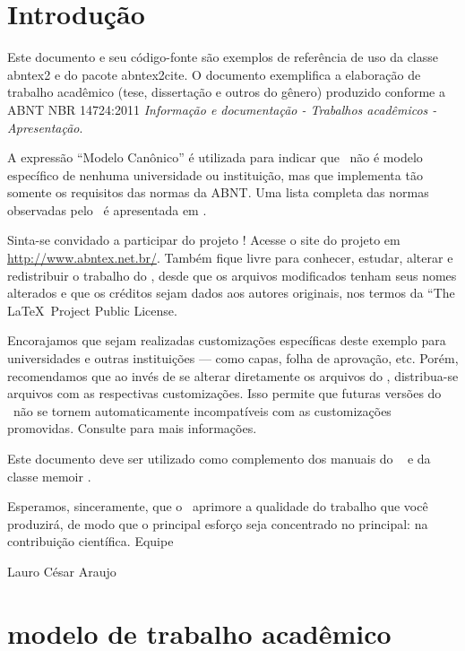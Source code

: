 \textual

\chapter{Introdução}

Este documento e seu código-fonte são exemplos de referência de uso da classe
\textsf{abntex2} e do pacote \textsf{abntex2cite}. O documento 
exemplifica a elaboração de trabalho acadêmico (tese, dissertação e outros do
gênero) produzido conforme a ABNT NBR 14724:2011 \emph{Informação e documentação
- Trabalhos acadêmicos - Apresentação}.

A expressão ``Modelo Canônico'' é utilizada para indicar que \abnTeX\ não é
modelo específico de nenhuma universidade ou instituição, mas que implementa tão
somente os requisitos das normas da ABNT. Uma lista completa das normas
observadas pelo \abnTeX\ é apresentada em .

Sinta-se convidado a participar do projeto \abnTeX! Acesse o site do projeto em
\url{http://www.abntex.net.br/}. Também fique livre para conhecer,
estudar, alterar e redistribuir o trabalho do \abnTeX, desde que os arquivos
modificados tenham seus nomes alterados e que os créditos sejam dados aos
autores originais, nos termos da ``The \LaTeX\ Project Public
License.

Encorajamos que sejam realizadas customizações específicas deste exemplo para
universidades e outras instituições --- como capas, folha de aprovação, etc.
Porém, recomendamos que ao invés de se alterar diretamente os arquivos do
\abnTeX, distribua-se arquivos com as respectivas customizações.
Isso permite que futuras versões do \abnTeX~não se tornem automaticamente
incompatíveis com as customizações promovidas. Consulte
 para mais informações.

Este documento deve ser utilizado como complemento dos manuais do \abnTeX\ 
\cite{abntex2classe,abntex2cite,abntex2cite-alf} e da classe \textsf{memoir}
\cite{memoir}. 

Esperamos, sinceramente, que o \abnTeX\ aprimore a qualidade do trabalho que
você produzirá, de modo que o principal esforço seja concentrado no principal:
na contribuição científica.
Equipe \abnTeX 

Lauro César Araujo

\chapter{modelo de trabalho acadêmico}

